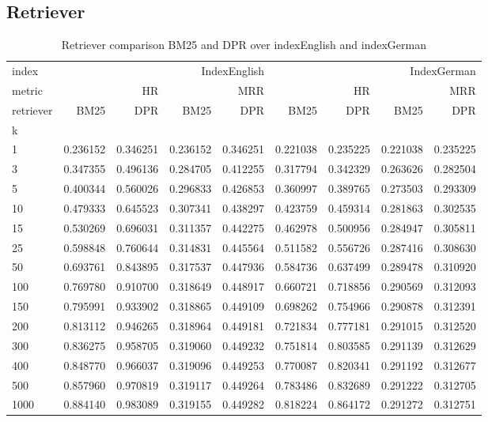 \subsection{Retriever}
\label{ref:appendixA-evaluation-retriever}

\begin{table}
    \centering    
    \begin{tabular}{lrrrrrrrr}
    \toprule
    index & \multicolumn{4}{r}{IndexEnglish} & \multicolumn{4}{r}{IndexGerman} \\
    metric & \multicolumn{2}{r}{HR} & \multicolumn{2}{r}{MRR} & \multicolumn{2}{r}{HR} & \multicolumn{2}{r}{MRR} \\
    retriever & BM25 & DPR & BM25 & DPR & BM25 & DPR & BM25 & DPR \\
    k &  &  &  &  &  &  &  &  \\
    \midrule
    1 & 0.236152 & 0.346251 & 0.236152 & 0.346251 & 0.221038 & 0.235225 & 0.221038 & 0.235225 \\
    3 & 0.347355 & 0.496136 & 0.284705 & 0.412255 & 0.317794 & 0.342329 & 0.263626 & 0.282504 \\
    5 & 0.400344 & 0.560026 & 0.296833 & 0.426853 & 0.360997 & 0.389765 & 0.273503 & 0.293309 \\
    10 & 0.479333 & 0.645523 & 0.307341 & 0.438297 & 0.423759 & 0.459314 & 0.281863 & 0.302535 \\
    15 & 0.530269 & 0.696031 & 0.311357 & 0.442275 & 0.462978 & 0.500956 & 0.284947 & 0.305811 \\
    25 & 0.598848 & 0.760644 & 0.314831 & 0.445564 & 0.511582 & 0.556726 & 0.287416 & 0.308630 \\
    50 & 0.693761 & 0.843895 & 0.317537 & 0.447936 & 0.584736 & 0.637499 & 0.289478 & 0.310920 \\
    100 & 0.769780 & 0.910700 & 0.318649 & 0.448917 & 0.660721 & 0.718856 & 0.290569 & 0.312093 \\
    150 & 0.795991 & 0.933902 & 0.318865 & 0.449109 & 0.698262 & 0.754966 & 0.290878 & 0.312391 \\
    200 & 0.813112 & 0.946265 & 0.318964 & 0.449181 & 0.721834 & 0.777181 & 0.291015 & 0.312520 \\
    300 & 0.836275 & 0.958705 & 0.319060 & 0.449232 & 0.751814 & 0.803585 & 0.291139 & 0.312629 \\
    400 & 0.848770 & 0.966037 & 0.319096 & 0.449253 & 0.770087 & 0.820341 & 0.291192 & 0.312677 \\
    500 & 0.857960 & 0.970819 & 0.319117 & 0.449264 & 0.783486 & 0.832689 & 0.291222 & 0.312705 \\
    1000 & 0.884140 & 0.983089 & 0.319155 & 0.449282 & 0.818224 & 0.864172 & 0.291272 & 0.312751 \\
    \bottomrule
    \end{tabular}
    \caption{Retriever comparison BM25 and DPR over indexEnglish and indexGerman}
\end{table}

